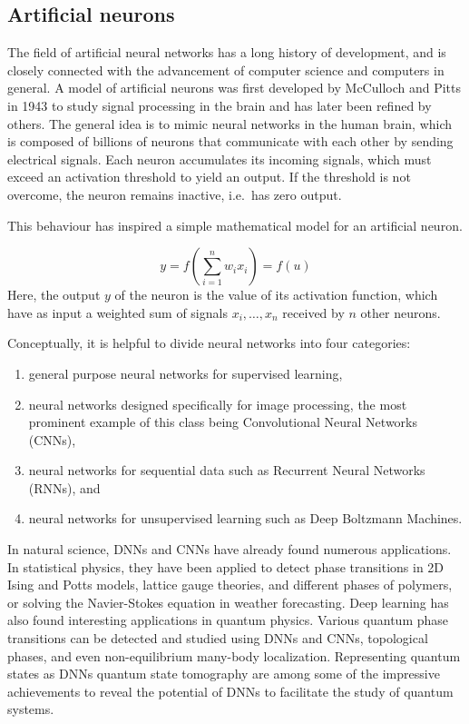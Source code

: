 \documentclass[%
oneside,                 %
final,                   %
10pt]{article}
\begin{document}
\subsection{Artificial neurons}

The field of artificial neural networks has a long history of
development, and is closely connected with the advancement of computer
science and computers in general. A model of artificial neurons was
first developed by McCulloch and Pitts in 1943 to study signal
processing in the brain and has later been refined by others. The
general idea is to mimic neural networks in the human brain, which is
composed of billions of neurons that communicate with each other by
sending electrical signals.  Each neuron accumulates its incoming
signals, which must exceed an activation threshold to yield an
output. If the threshold is not overcome, the neuron remains inactive,
i.e.~has zero output.

This behaviour has inspired a simple mathematical model for an artificial neuron.

\begin{equation}
 y = f\left(\sum_{i=1}^n w_ix_i\right) = f(u)
 \label{artificialNeuron}
\end{equation}
Here, the output $y$ of the neuron is the value of its activation function, which have as input
a weighted sum of signals $x_i, \dots ,x_n$ received by $n$ other neurons.

Conceptually, it is helpful to divide neural networks into four
categories:
\begin{enumerate}
\item general purpose neural networks for supervised learning,

\item neural networks designed specifically for image processing, the most prominent example of this class being Convolutional Neural Networks (CNNs),

\item neural networks for sequential data such as Recurrent Neural Networks (RNNs), and

\item neural networks for unsupervised learning such as Deep Boltzmann Machines.
\end{enumerate}

\noindent
In natural science, DNNs and CNNs have already found numerous
applications. In statistical physics, they have been applied to detect
phase transitions in 2D Ising and Potts models, lattice gauge
theories, and different phases of polymers, or solving the
Navier-Stokes equation in weather forecasting.  Deep learning has also
found interesting applications in quantum physics. Various quantum
phase transitions can be detected and studied using DNNs and CNNs,
topological phases, and even non-equilibrium many-body
localization. Representing quantum states as DNNs quantum state
tomography are among some of the impressive achievements to reveal the
potential of DNNs to facilitate the study of quantum systems.
\end{document}
